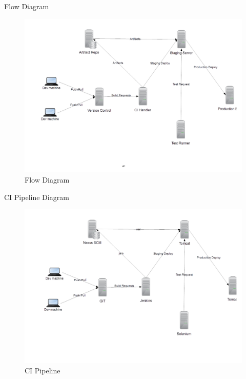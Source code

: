 \documentclass{beamer}
\begin{document}
\begin{frame}{Flow Diagram}

\begin{figure}[h]
\begin{center}
\includegraphics[scale=0.28]{flow1.png}
\caption{Flow Diagram}
\end{center}
\end{figure}
\end{frame}

\begin{frame}{CI Pipeline Diagram}

\begin{figure}[h]
\begin{center}
\includegraphics[scale=0.28]{pipeline.png}
\caption{CI Pipeline}
\end{center}
\end{figure}
\end{frame}
\end{document}
